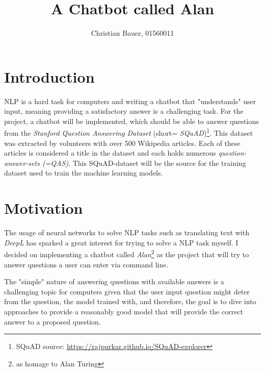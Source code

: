 
\title{A Chatbot called Alan}
\author{Christian Bauer, 01560011}
\date{}

% 
% 




\maketitle



\section{Introduction}
\label{sec:introduction}
    NLP is a hard task for computers and writing a chatbot that "understands" user input, meaning providing a satisfactory answer is a challenging task.
    For the project, a chatbot will be implemented, which should be able to answer questions from the \emph{Stanford Question Answering Dataset} (short= \emph{SQuAD})\footnote{SQuAD source: \url{https://rajpurkar.github.io/SQuAD-explorer}}.
    This dataset was extracted by volunteers with over 500 Wikipedia articles. 
    Each of these articles is considered a title in the dataset and each holds numerous \emph{question-answer-sets (=QAS)}.
    This SQuAD-dataset will be the source for the training dataset used to train the machine learning models.
    

\section{Motivation}
\label{sec:motivation}
    The usage of neural networks to solve NLP tasks such as translating text with \emph{DeepL} has sparked a great interest for trying to solve a NLP task myself.
    I decided on implementing a chatbot called \emph{Alan}\footnote{as homage to Alan Turing} as the project that will try to answer questions a user can enter via command line.

    The "simple" nature of answering questions with available answers is a challenging topic for computers given that the user input question might deter from the question, the model trained with, and therefore, the goal is to dive into approaches to provide a reasonably good model that will provide the correct answer to a proposed question.

